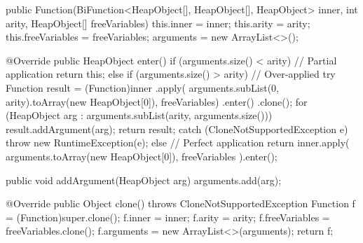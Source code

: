 \documentclass[dissertation.tex]{subfiles}
\begin{document}
{{{{\begin{javafigure}
{                    public Function(BiFunction<HeapObject[], HeapObject[], HeapObject> inner,
                                    int arity, HeapObject[] freeVariables) {
                        this.inner = inner;
                        this.arity = arity;
                        this.freeVariables = freeVariables;
                        arguments = new ArrayList<>();
                    }
                                
                    @Override
                    public HeapObject enter() {
                        if (arguments.size() < arity) { // Partial application
                            return this;
                        }
                        else if (arguments.size() > arity) { // Over-applied
                            try {
                                Function result = (Function)inner
                                    .apply(
                                        arguments.subList(0, arity).toArray(new HeapObject[0]),
                                        freeVariables)
                                    .enter()
                                    .clone();
                                for (HeapObject arg : arguments.subList(arity, arguments.size()))
                                    result.addArgument(arg);
                                return result;
                            }
                            catch (CloneNotSupportedException e) {
                                throw new RuntimeException(e);
                            }
                        }
                        else { // Perfect application
                            return inner.apply(
                                arguments.toArray(new HeapObject[0]), freeVariables
                            ).enter();
                        }
                    }
                                
                    public void addArgument(HeapObject arg) {
                        arguments.add(arg);
                    }
                                
                    @Override
                    public Object clone() throws CloneNotSupportedException {
                        Function f = (Function)super.clone();
                        f.inner = inner;
                        f.arity = arity;
                        f.freeVariables = freeVariables.clone();
                        f.arguments = new ArrayList<>(arguments);
                        return f;
                    }
                }
                \end{javafigure}

}}}}
\end{document}
